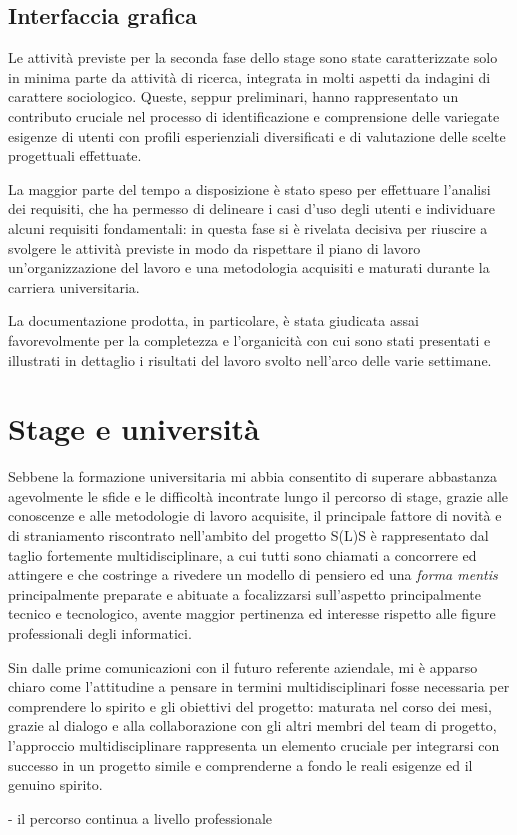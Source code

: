 \subsection{Interfaccia grafica}
Le attività previste per la seconda fase dello stage sono state caratterizzate solo in minima parte da attività di ricerca, integrata in molti aspetti da indagini di carattere sociologico. Queste, seppur preliminari, hanno rappresentato un contributo cruciale nel processo di identificazione e comprensione delle variegate esigenze di utenti con profili esperienziali diversificati e di valutazione delle scelte progettuali effettuate.

La maggior parte del tempo a disposizione è stato speso per effettuare l'analisi dei requisiti, che ha permesso di delineare i casi d'uso degli utenti e individuare alcuni requisiti fondamentali: in questa fase si è rivelata decisiva per riuscire a svolgere le attività previste in modo da rispettare il piano di lavoro un'organizzazione del lavoro e una metodologia acquisiti e maturati durante la carriera universitaria.

La documentazione prodotta, in particolare, è stata giudicata assai favorevolmente per la completezza e l'organicità con cui sono stati presentati e illustrati in dettaglio i risultati del lavoro svolto nell'arco delle varie settimane.

\section{Stage e università}
Sebbene la formazione universitaria mi abbia consentito di superare abbastanza agevolmente le sfide e le difficoltà incontrate lungo il percorso di stage, grazie alle conoscenze e alle metodologie di lavoro acquisite, il principale fattore di novità e di straniamento riscontrato nell'ambito del progetto S(L)S è rappresentato dal taglio fortemente multidisciplinare, a cui tutti sono chiamati a concorrere ed attingere e che costringe a rivedere un modello di pensiero ed una \textit{forma mentis} principalmente preparate e abituate a focalizzarsi sull'aspetto principalmente tecnico e tecnologico, avente maggior pertinenza ed interesse rispetto alle figure professionali degli informatici.

Sin dalle prime comunicazioni con il futuro referente aziendale, mi è apparso chiaro come l'attitudine a pensare in termini multidisciplinari fosse necessaria per comprendere lo spirito e gli obiettivi del progetto: maturata nel corso dei mesi, grazie al dialogo e alla collaborazione con gli altri membri del team di progetto, l'approccio multidisciplinare rappresenta un elemento cruciale per integrarsi con successo in un progetto simile e comprenderne a fondo le reali esigenze ed il genuino spirito.

- il percorso continua a livello professionale
